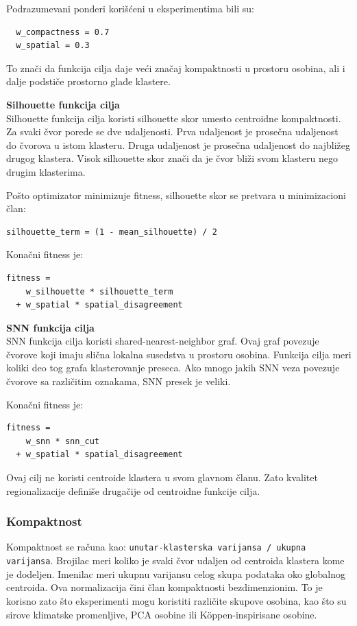 \documentclass[11pt]{article}
\begin{document}
Podrazumevani ponderi korišćeni u eksperimentima bili su:
\begin{verbatim}
  w_compactness = 0.7
  w_spatial = 0.3
\end{verbatim}

To znači da funkcija cilja daje veći značaj kompaktnosti u prostoru osobina, ali i dalje podstiče prostorno glađe klastere.

\textbf{Silhouette funkcija cilja} \\
Silhouette funkcija cilja koristi silhouette skor umesto centroidne kompaktnosti. Za svaki čvor porede se dve udaljenosti. Prva udaljenost je prosečna udaljenost do čvorova u istom klasteru. Druga udaljenost je prosečna udaljenost do najbližeg drugog klastera. Visok silhouette skor znači da je čvor bliži svom klasteru nego drugim klasterima.

Pošto optimizator minimizuje fitness, silhouette skor se pretvara u minimizacioni član:
\begin{verbatim}
silhouette_term = (1 - mean_silhouette) / 2
\end{verbatim}

Konačni fitness je:
\begin{verbatim}
fitness =
    w_silhouette * silhouette_term
  + w_spatial * spatial_disagreement
\end{verbatim}

\textbf{SNN funkcija cilja} \\
SNN funkcija cilja koristi shared-nearest-neighbor graf. Ovaj graf povezuje čvorove koji imaju slična lokalna susedstva u prostoru osobina. Funkcija cilja meri koliki deo tog grafa klasterovanje preseca. Ako mnogo jakih SNN veza povezuje čvorove sa različitim oznakama, SNN presek je veliki.

Konačni fitness je:
\begin{verbatim}
fitness =
    w_snn * snn_cut
  + w_spatial * spatial_disagreement
\end{verbatim}

Ovaj cilj ne koristi centroide klastera u svom glavnom članu. Zato kvalitet regionalizacije definiše drugačije od centroidne funkcije cilja.

\subsubsection{Kompaktnost}
Kompaktnost se računa kao:
\texttt{unutar-klasterska varijansa / ukupna varijansa}. Brojilac meri koliko je svaki čvor udaljen od centroida klastera kome je dodeljen. Imenilac meri ukupnu varijansu celog skupa podataka oko globalnog centroida. Ova normalizacija čini član kompaktnosti bezdimenzionim. To je korisno zato što eksperimenti mogu koristiti različite skupove osobina, kao što su sirove klimatske promenljive, PCA osobine ili Köppen-inspirisane osobine.
\end{document}
